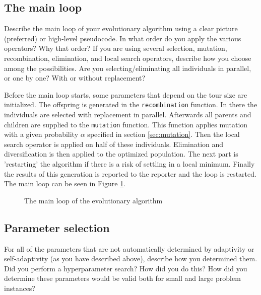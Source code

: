 \documentclass[a4paper,10pt]{article}
\newcommand{\ReplaceMe}[1]{{\color{blue}#1}}
\begin{document}
\subsection{The main loop}

\ReplaceMe{Describe the main loop of your evolutionary algorithm using a clear picture (preferred) or high-level pseudocode. In what order do you apply the various operators? Why that order? If you are using several selection, mutation, recombination, elimination, and local search operators, describe how you choose among the possibilities. Are you selecting/eliminating all individuals in parallel, or one by one? With or without replacement?}

Before the main loop starts, some parameters that depend on the tour size are initialized. The offspring is generated in the \texttt{recombination} function. In there the individuals are selected with replacement in parallel. Afterwards all parents and children are supplied to the \texttt{mutation} function. This function applies mutation with a given probability $\alpha$ specified in section \ref{sec:mutation}. Then the local search operator is applied on half of these individuals. Elimination and diversification is then applied to the optimized population. The next part is 'restarting' the algorithm if there is a risk of settling in a local minimum. Finally the results of this generation is reported to the reporter and the loop is restarted. The main loop can be seen in Figure \ref{code:main}.

\begin{figure}
\caption{The main loop of the evolutionary algorithm}
\label{code:main}
\end{figure}


\subsection{Parameter selection} \label{sec:hyperparameter}

\ReplaceMe{For all of the parameters that are not automatically determined by adaptivity or self-adaptivity (as you have described above), describe how you determined them. Did you perform a hyperparameter search? How did you do this? How did you determine these parameters would be valid both for small and large problem instances?}
\end{document}
